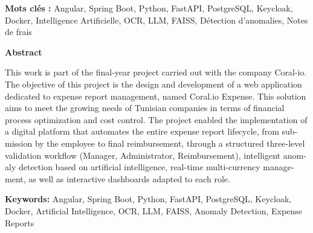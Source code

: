 \documentclass[12pt,a4paper]{report}
\begin{document}
\textbf{Mots clés :} Angular, Spring Boot, Python, FastAPI, PostgreSQL, Keycloak, Docker, Intelligence Artificielle, OCR, LLM, FAISS, Détection d'anomalies, Notes de frais



\vspace{1cm}



\begin{center}

 {\Huge \bfseries Abstract}

\end{center}

\vspace{0.5cm}



\begin{otherlanguage}{english}

This work is part of the final-year project carried out with the company Coral-io. The objective of this project is the design and development of a web application dedicated to expense report management, named Coral.io Expense. This solution aims to meet the growing needs of Tunisian companies in terms of financial process optimization and cost control. The project enabled the implementation of a digital platform that automates the entire expense report lifecycle, from submission by the employee to final reimbursement, through a structured three-level validation workflow (Manager, Administrator, Reimbursement), intelligent anomaly detection based on artificial intelligence, real-time multi-currency management, as well as interactive dashboards adapted to each role.



\textbf{Keywords:} Angular, Spring Boot, Python, FastAPI, PostgreSQL, Keycloak, Docker, Artificial Intelligence, OCR, LLM, FAISS, Anomaly Detection, Expense Reports

\end{otherlanguage}
\end{document}
